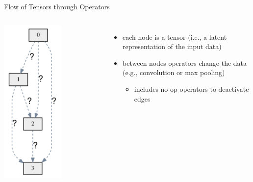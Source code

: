 \begin{frame}[c]{Flow of Tensors through Operators}


\begin{columns}

\centering
\includegraphics[width=0.6\textwidth]{images/nas_darts_space_idea.png}


\begin{itemize}
	\item each node is a tensor (i.e., a latent representation of the input data)
	\item between nodes operators change the data\\ (e.g., convolution or max pooling)
	\begin{itemize}  
		\item includes no-op operators to deactivate edges
	\end{itemize}
\end{itemize}



\end{columns}
\end{frame}
